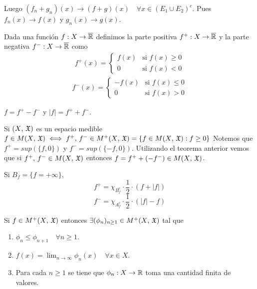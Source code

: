 Luego $(f_n + g_n)(x) \to (f+g)(x) \quad \forall x \in (E_1 \cup E_2)^c$. Pues $f_n(x) \to f(x)$ y $g_n(x) \to g(x)$.

\clearpage

\begin{definition}
    Dada una función $f : X \to \overline{\mathbb{R}}$ definimos la parte positiva $f^{+} : X \to \overline{\mathbb{R}}$ y la parte negativa $f^{-} : X \to \overline{\mathbb{R}}$ como
    \begin{align*}
        f^{+}(x) = \begin{cases}
                       f(x) & \text{si } f(x) \geq 0 \\
                       0    & \text{si } f(x) < 0
                   \end{cases}
    \end{align*}
    \begin{align*}
        f^{-}(x) = \begin{cases}
                       -f(x) & \text{si } f(x) \leq 0 \\
                       0     & \text{si } f(x) > 0
                   \end{cases}
    \end{align*}
\end{definition}

\begin{note}
    $f = f^{+} - f^{-}$ y $|f| = f^{+} + f^{-}$.
\end{note}

\begin{note}
    Si $(X \text{, } \mathfrak{X})$ es un espacio medible $f \in M(X\text{, } \mathfrak{X}) \iff f^{+} \text{, } f^{-} \in M^{+}(X\text{, } \mathfrak{X}) = \{ f \in M(X\text{, } \mathfrak{X}) : f \geq 0 \}$
    Notemos que $f^{+} = sup(\{ f, 0 \})$ y $f^{-} = sup(\{ -f, 0 \})$.
    Utilizando el teorema anterior vemos que si $f^{+} \text{, } f^{-} \in M(X\text{, } \mathfrak{X})$ entonces $f = f^{+} + (-f^{-}) \in M(X\text{, } \mathfrak{X})$.
\end{note}

\begin{note}
    Si $B_f = \{ f = +\infty \}$,
    \[ f^+ = \chi_{B_f^c} \cdot \frac{1}{2} \cdot (f + |f|) \]
    \[ f^- = \chi_{A_f^c} \cdot \frac{1}{2} \cdot (|f| - f) \]
\end{note}

\begin{theorem}
    Si $f \in M^+(X \text{, } \mathfrak{X})$ entonces $\exists (\phi_n)_{n \geq 1} \in M^+(X \text{, } \mathfrak{X})$ tal que \begin{enumerate}
        \item $\phi_n \leq \phi_{n+1} \quad \forall n \geq 1$.
        \item $f(x) = \lim_{n \to \infty} \phi_n(x) \quad \forall x \in X$.
        \item Para cada $n \geq 1$ se tiene que $\phi_n : X \to \mathbb{R}$ toma una cantidad finita de valores.
    \end{enumerate}
\end{theorem}

